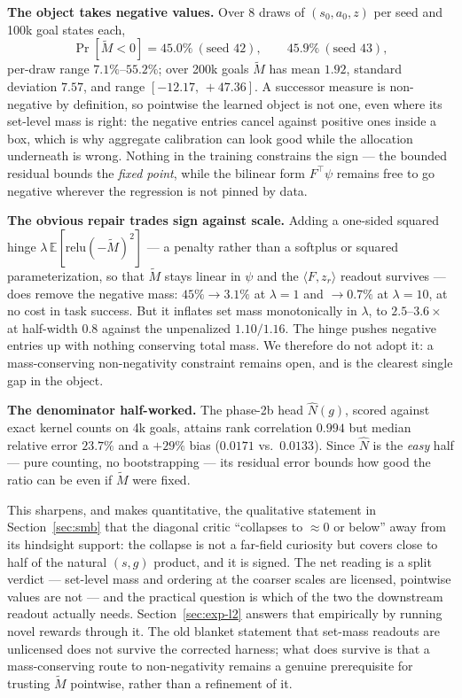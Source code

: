 \documentclass[10pt]{article}
\newcommand{\E}{\mathbb{E}}
\begin{document}
\textbf{The object takes negative values.} Over 8 draws of $(s_0,a_0,z)$ per
seed and 100k goal states each,
\[
\Pr[\tilde M < 0] = 45.0\%\ (\text{seed }42),\qquad 45.9\%\ (\text{seed }43),
\]
per-draw range $7.1\%$--$55.2\%$; over 200k goals $\tilde M$ has mean $1.92$,
standard deviation $7.57$, and range $[-12.17,\,+47.36]$. A successor measure is
non-negative by definition, so pointwise the learned object is not one, even
where its set-level mass is right: the negative entries cancel against positive
ones inside a box, which is why aggregate calibration can look good while the
allocation underneath is wrong. Nothing in the training constrains the sign ---
the bounded residual bounds the \emph{fixed point}, while the bilinear form
$F^\top\!\psi$ remains free to go negative wherever the regression is not pinned
by data.

\textbf{The obvious repair trades sign against scale.} Adding a one-sided squared
hinge $\lambda\,\E[\mathrm{relu}(-\tilde M)^2]$ --- a penalty rather than a
softplus or squared parameterization, so that $\tilde M$ stays linear in $\psi$
and the $\langle F,z_r\rangle$ readout survives --- does remove the negative mass:
$45\%\to3.1\%$ at $\lambda{=}1$ and $\to0.7\%$ at $\lambda{=}10$, at no cost in
task success. But it inflates set mass monotonically in $\lambda$, to
$2.5$--$3.6\times$ at half-width $0.8$ against the unpenalized $1.10/1.16$. The
hinge pushes negative entries up with nothing conserving total mass. We therefore
do not adopt it: a mass-conserving non-negativity constraint remains open, and is
the clearest single gap in the object.

\textbf{The denominator half-worked.} The phase-2b head $\hat N(g)$, scored
against exact kernel counts on 4k goals, attains rank correlation $0.994$ but
median relative error $23.7\%$ and a $+29\%$ bias ($0.0171$ vs.\ $0.0133$).
Since $\hat N$ is the \emph{easy} half --- pure counting, no bootstrapping ---
its residual error bounds how good the ratio can be even if $\tilde M$ were
fixed.

This sharpens, and makes quantitative, the qualitative statement in
Section~\ref{sec:smb} that the diagonal critic ``collapses to $\approx 0$ or
below'' away from its hindsight support: the collapse is not a far-field
curiosity but covers close to half of the natural $(s,g)$ product, and it is
signed. The net reading is a split verdict --- set-level mass and ordering at
the coarser scales are licensed, pointwise values are not --- and the practical
question is which of the two the downstream readout actually needs.
Section~\ref{sec:exp-l2} answers that empirically by running novel rewards
through it. The old blanket statement that set-mass readouts are
unlicensed does not survive the corrected harness; what does survive is that a
mass-conserving route to non-negativity remains a genuine prerequisite for
trusting $\tilde M$ pointwise, rather than a refinement of it.
\end{document}
